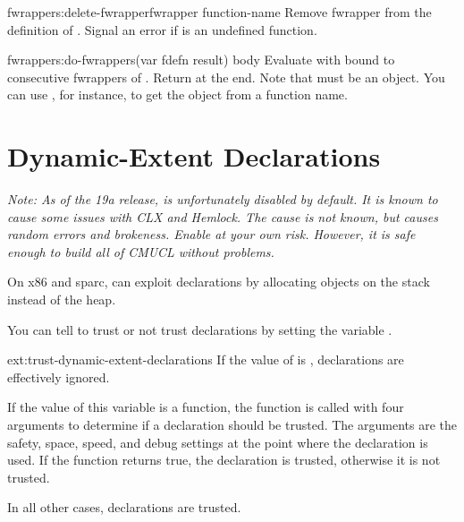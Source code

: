 \begin{defun}{fwrappers:}{delete-fwrapper}{fwrapper function-name}
  Remove fwrapper  from the definition of
  .  Signal an error if  is an
  undefined function.
\end{defun}

\begin{defmac}{fwrappers:}{do-fwrappers}{(var fdefn \ampoptional
  result) \ampbody body}
  Evaluate  with  bound to consecutive fwrappers of
  .  Return  at the end.  Note that 
  must be an  object.  You can use
  , for instance, to get the 
  object from a function name.
\end{defmac}

\section{Dynamic-Extent Declarations}

\emph{Note:  As of the 19a release,  is
  unfortunately disabled by default.  It is known to cause some issues
  with CLX and Hemlock.  The cause is not known, but causes random
  errors and brokeness.  Enable at your own risk.  However, it is safe
  enough to build all of CMUCL without problems.}

On x86 and sparc, \cmucl{} can exploit 
declarations by allocating objects on the stack instead of the heap.

You can tell \cmucl{} to trust or not trust 
declarations by setting the variable
.

\begin{defvar}{ext:}{trust-dynamic-extent-declarations}
  If the value of  is 
  ,  declarations are effectively
  ignored.

  If the value of this variable is a function, the function is called
  with four arguments to determine if a  
  declaration should be trusted.  The arguments are the safety,
  space, speed, and debug settings at the point where the 
   declaration is used.  If the function
  returns true, the declaration is trusted, otherwise it is not
  trusted.

  In all other cases,  declarations are
  trusted.
\end{defvar}

